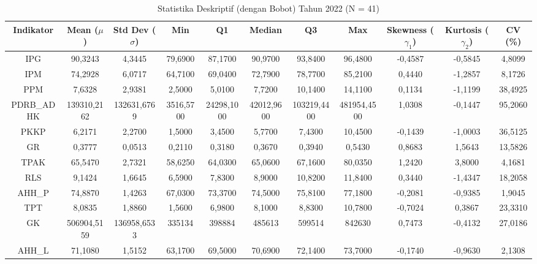\begin{table}[H]
\centering
\caption{Statistika Deskriptif (dengan Bobot) Tahun 2022 (N = 41)} \label{tab:app1desc_2022}
\begin{adjustbox}{max width=\textwidth, max height=0.85\textheight}
\begin{tabular}{|c|c|c|c|c|c|c|c|c|c|c|}
\hline
\textbf{Indikator} & \textbf{Mean ($\mu$)} & \textbf{Std Dev ($\sigma$)} & \textbf{Min} & \textbf{Q1} & \textbf{Median} & \textbf{Q3} & \textbf{Max} & \textbf{Skewness ($\gamma_1$)} & \textbf{Kurtosis ($\gamma_2$)} & \textbf{CV (\%)} \\
\hline
IPG & 90,3243 & 4,3445 & 79,6900 & 87,1700 & 90,9700 & 93,8400 & 96,4800 & -0,4587 & -0,5845 & 4,8099 \\
IPM & 74,2928 & 6,0717 & 64,7100 & 69,0400 & 72,7900 & 78,7700 & 85,2100 & 0,4440 & -1,2857 & 8,1726 \\
PPM & 7,6328 & 2,9381 & 2,5000 & 5,0100 & 7,7200 & 10,1400 & 14,1100 & 0,1134 & -1,1199 & 38,4925 \\
PDRB\_ADHK & 139310,2162 & 132631,6769 & 3516,5700 & 24298,1000 & 42012,9600 & 103219,4400 & 481954,4500 & 1,0308 & -0,1447 & 95,2060 \\
PKKP & 6,2171 & 2,2700 & 1,5000 & 3,4500 & 5,7700 & 7,4300 & 10,4500 & -0,1439 & -1,0003 & 36,5125 \\
GR & 0,3777 & 0,0513 & 0,2110 & 0,3180 & 0,3670 & 0,3940 & 0,5430 & 0,8683 & 1,5643 & 13,5826 \\
TPAK & 65,5470 & 2,7321 & 58,6250 & 64,0300 & 65,0600 & 67,1600 & 80,0350 & 1,2420 & 3,8000 & 4,1681 \\
RLS & 9,1424 & 1,6645 & 6,5900 & 7,8300 & 8,9000 & 10,8200 & 11,8400 & 0,3440 & -1,4347 & 18,2058 \\
AHH\_P & 74,8870 & 1,4263 & 67,0300 & 73,3700 & 74,5000 & 75,8100 & 77,1800 & -0,2081 & -0,9385 & 1,9045 \\
TPT & 8,0835 & 1,8860 & 1,5600 & 6,9800 & 8,1000 & 8,8300 & 10,7800 & -0,7024 & 0,3867 & 23,3310 \\
GK & 506904,5159 & 136958,6533 & 335134 & 398884 & 485613 & 599514 & 842630 & 0,7473 & -0,4132 & 27,0186 \\
AHH\_L & 71,1080 & 1,5152 & 63,1700 & 69,5000 & 70,6900 & 72,1400 & 73,7000 & -0,1740 & -0,9630 & 2,1308 \\
\hline
\end{tabular}
\end{adjustbox}
\end{table}